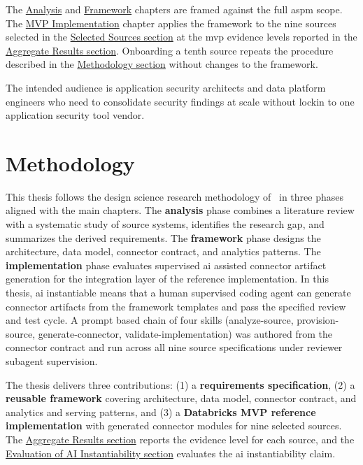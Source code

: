 The \hyperref[ch:analysis]{Analysis} and \hyperref[ch:framework]{Framework} chapters are framed against the full \gls{aspm} scope. The \hyperref[ch:implementation]{MVP Implementation} chapter applies the framework to the nine sources selected in the \hyperref[sec:selected-sources]{Selected Sources section} at the \gls{mvp} evidence levels reported in the \hyperref[sec:impl-results]{Aggregate Results section}. Onboarding a tenth source repeats the procedure described in the \hyperref[sec:impl-methodology]{Methodology section} without changes to the framework.

The intended audience is application security architects and data platform engineers who need to consolidate security findings at scale without lockin to one application security tool vendor.

\section*{Methodology}

This thesis follows the design science research methodology of~\textcite{Hevner2004, Peffers2007} in three phases aligned with the main chapters. The \textbf{analysis} phase combines a literature review with a systematic study of source systems, identifies the research gap, and summarizes the derived requirements. The \textbf{framework} phase designs the architecture, data model, connector contract, and analytics patterns. The \textbf{implementation} phase evaluates supervised \gls{ai} assisted connector artifact generation for the integration layer of the reference implementation. In this thesis, \gls{ai} instantiable means that a human supervised coding agent can generate connector artifacts from the framework templates and pass the specified review and test cycle. A prompt based chain of four skills (analyze-source, provision-source, generate-connector, validate-implementation) was authored from the connector contract and run across all nine source specifications under reviewer subagent supervision.

The thesis delivers three contributions: (1) a \textbf{requirements specification}, (2) a \textbf{reusable framework} covering architecture, data model, connector contract, and analytics and serving patterns, and (3) a \textbf{Databricks MVP reference implementation} with generated connector modules for nine selected sources. The \hyperref[sec:impl-results]{Aggregate Results section} reports the evidence level for each source, and the \hyperref[sec:ai-eval]{Evaluation of AI Instantiability section} evaluates the \gls{ai} instantiability claim.

